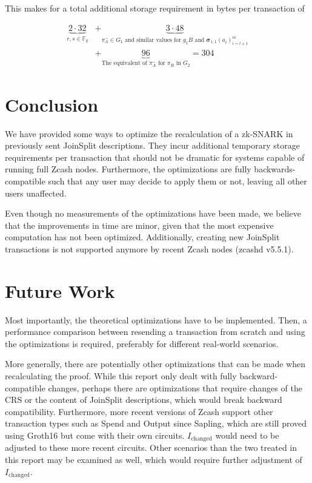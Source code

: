 \documentclass{article}
\begin{document}
This makes for a total additional storage requirement in bytes per transaction of

\begin{align*}
        \underbrace{2\cdot 32}_\text{$r,s \in \mathbb{F}_q$} &+ \underbrace{3\cdot 48}_\text{$\pi^-_A \in G_1$ and similar values for $g_1B$ and $\boldsymbol\sigma_{1,1}(a_i)_{i=l+1}^m$} \\
        &+ \underbrace{96}_\text{The equivalent of $\pi^-_A$ for $\pi_B$ in $G_2$} = 304
\end{align*}

\section{Conclusion} \label{sec:conclusion}

We have provided some ways to optimize the recalculation of a zk-SNARK in previously sent JoinSplit descriptions.
They incur additional temporary storage requirements per transaction that should not be dramatic for systems capable of running full Zcash nodes.
Furthermore, the optimizations are fully backwards-compatible such that any user may decide to apply them or not, leaving all other users unaffected.

Even though no measurements of the optimizations have been made, we believe that the improvements in time are minor, given that the most expensive
computation has not been optimized.
Additionally, creating new JoinSplit transactions is not supported anymore by recent Zcash nodes (zcashd v5.5.1).

\section{Future Work} \label{sec:future}

Most importantly, the theoretical optimizations have to be implemented.
Then, a performance comparison between resending a transaction from scratch and using the optimizations is required, preferably for different real-world scenarios.

More generally, there are potentially other optimizations that can be made when recalculating the proof.
While this report only dealt with fully backward-compatible changes, perhaps there are optimizations that require changes of the CRS or the content of JoinSplit descriptions, which would break backward compatibility.
Furthermore, more recent versions of Zcash support other transaction types such as Spend and Output since Sapling, which are still proved using Groth16 but come with their own circuits.
$I_\text{changed}$ would need to be adjusted to these more recent circuits.
Other scenarios than the two treated in this report may be examined as well, which would require further adjustment of $I_\text{changed}$.
\end{document}
